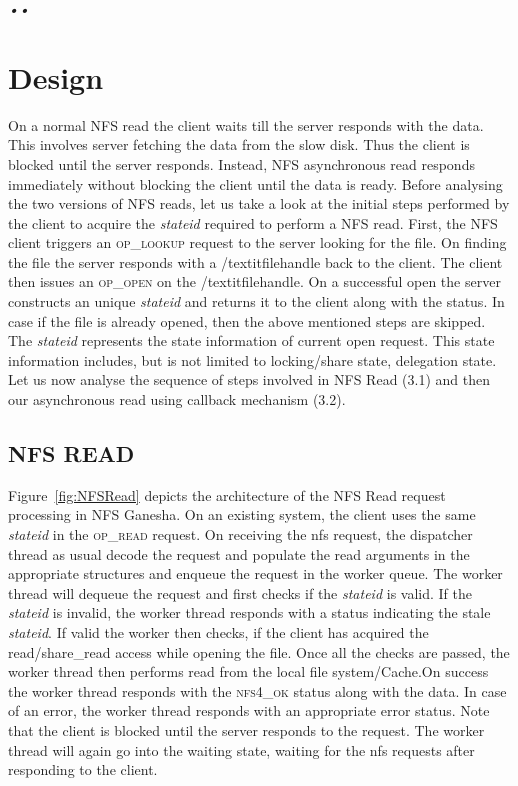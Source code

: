 \textit{\emph{•\emph{\textit{•}}}}\section{Design}

\label{Design}

On a normal NFS read the client waits till the server responds with the data. This involves server fetching the data from the slow disk. Thus the client is blocked until the server responds. Instead, NFS asynchronous read responds immediately without blocking the client until the data is ready. Before analysing the two versions of NFS reads, let us take a look at the initial steps performed by the client to acquire the \textit{stateid} required to perform a NFS read. First, the NFS client triggers an \textsc{op\_lookup} request to the server looking for the file. On finding the file the server responds with a /textit{filehandle} back to the client. The client then issues an \textsc{op\_open} on the /textit{filehandle}. On a successful open the server constructs an unique \textit{stateid} and returns it to the client along with the status. In case if the file is already opened,    then the above mentioned steps are skipped. The \textit{stateid} represents the state information of current open request. This state information includes, but is not limited to locking/share state, delegation state. Let us now analyse the sequence of steps involved in NFS Read (3.1) and then our asynchronous read using callback mechanism (3.2).



\subsection{NFS READ}

Figure~\ref{fig:NFSRead} depicts the architecture of the NFS Read request processing in NFS Ganesha. On an existing system, the client uses the same \textit{stateid} in the \textsc{op\_read} request. On receiving the nfs request, the dispatcher thread as usual decode the request and populate the read arguments in the appropriate structures and enqueue the request in the worker queue. The worker thread will dequeue the request and 
first checks if the \textit{stateid} is valid. If the \textit{stateid} is invalid, the worker thread responds with a status indicating the stale \textit{stateid}. If valid the worker then checks, if the client has acquired the read/share\_read access while opening the file. Once all the checks are passed, the worker thread then performs read from the local file system/Cache.On success the worker thread responds with the \textsc{nfs4\_ok} status along with the data. In case of an error, the worker thread responds with an appropriate error status. Note that the client is blocked until the server responds to the request. The worker thread will again go into the waiting state, waiting for the nfs requests after responding to the client.


